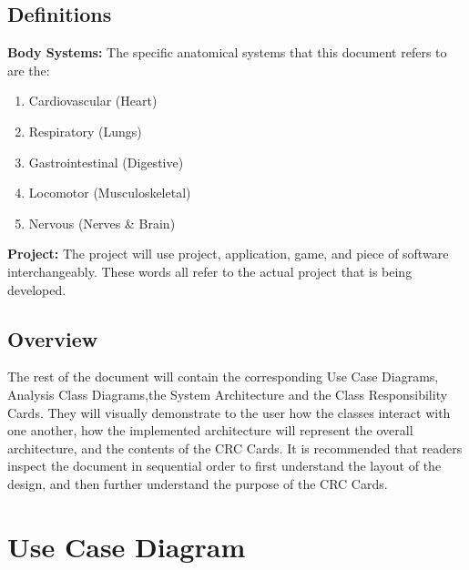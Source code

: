 \documentclass[]{article}
\begin{document}
\subsection{Definitions}
\label{sub:system_description}

\hspace{5mm}\textbf{Body Systems:} The specific anatomical systems that this document refers to are the:
\begin{enumerate}
	\item Cardiovascular (Heart)
	\item Respiratory (Lungs)
	\item Gastrointestinal (Digestive)
	\item Locomotor (Musculoskeletal)
	\item Nervous (Nerves \& Brain)
\end{enumerate} 

\vspace{5mm}

\textbf{Project:} The project will use project, application, game, and piece of software interchangeably.
These words all refer to the actual project that is being developed.

\subsection{Overview}
\label{sub:overview}
The rest of the document will contain the corresponding Use Case Diagrams,
Analysis Class Diagrams,the System Architecture and the Class Responsibility Cards.
They will visually demonstrate to the user how the classes interact with one another,
how the implemented architecture will represent the overall architecture,
and the contents of the CRC Cards. It is recommended that readers inspect the
document in sequential order to first understand the layout of the design, and then
further understand the purpose of the CRC Cards.




\section{Use Case Diagram}
\label{sec:use_case_diagram}
\end{document}
